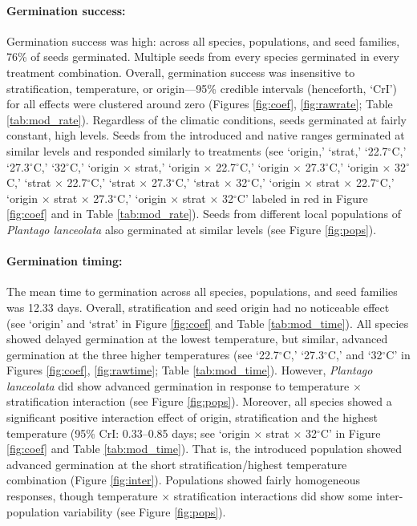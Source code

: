 \documentclass[11pt]{article}\usepackage[]{graphicx}\usepackage[]{color}
\begin{document}
	\paragraph{Germination success:} Germination success was high: across all species, populations, and seed families, 76\% of seeds germinated. Multiple seeds from every species germinated in every treatment combination. Overall, germination success was insensitive to stratification, temperature, or origin---95\% credible intervals (henceforth, `CrI') for all effects were clustered around zero (Figures \ref{fig:coef}, \ref{fig:rawrate}; Table \ref{tab:mod_rate}). Regardless of the climatic conditions, seeds germinated at fairly constant, high levels. Seeds from the introduced and native ranges germinated at similar levels and responded similarly to treatments (see `origin,' `strat,' `22.7$^{\circ}$C,' `27.3$^{\circ}$C,' `32$^{\circ}$C,' `origin $\times$ strat,' `origin $\times$ 22.7$^{\circ}$C,' `origin $\times$ 27.3$^{\circ}$C,' `origin $\times$ 32$^{\circ}$C,' `strat $\times$ 22.7$^{\circ}$C,' `strat $\times$ 27.3$^{\circ}$C,' `strat $\times$ 32$^{\circ}$C,' `origin $\times$ strat $\times$ 22.7$^{\circ}$C,' `origin $\times$ strat $\times$ 27.3$^{\circ}$C,' `origin $\times$ strat $\times$ 32$^{\circ}$C' labeled in red in Figure \ref{fig:coef} and in Table \ref{tab:mod_rate}). Seeds from different local populations of \textit{Plantago lanceolata} also germinated at similar levels (see Figure \ref{fig:pops}).
	\paragraph{Germination timing:} The mean time to germination across all species, populations, and seed families was 12.33 days.   Overall, stratification and seed origin had no noticeable effect (see `origin' and `strat' in Figure \ref{fig:coef} and Table \ref{tab:mod_time}). All species showed delayed germination at the lowest temperature, but similar, advanced germination at the  three higher temperatures (see `22.7$^{\circ}$C,' `27.3$^{\circ}$C,' and `32$^{\circ}$C' in Figures \ref{fig:coef}, \ref{fig:rawtime}; Table \ref{tab:mod_time}). However, \textit{Plantago lanceolata} did show advanced germination in response to temperature $\times$ stratification interaction (see Figure \ref{fig:pops}).  Moreover, all species showed a significant positive interaction effect of origin, stratification and the highest temperature (95\% CrI: 0.33--0.85 days; see `origin $\times$ strat $\times$ 32$^{\circ}$C' in Figure \ref{fig:coef} and Table \ref{tab:mod_time}). That is, the introduced population showed advanced germination at the short stratification/highest temperature combination (Figure \ref{fig:inter}).  Populations showed fairly homogeneous responses, though temperature $\times$ stratification interactions did show some inter-population variability (see Figure \ref{fig:pops}). 
\end{document}
